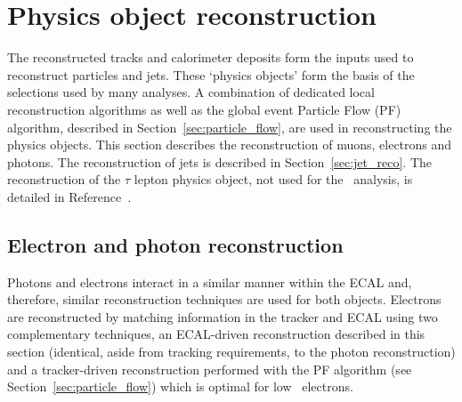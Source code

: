 \section{Physics object reconstruction}

The reconstructed tracks and calorimeter deposits form 
the inputs used to reconstruct particles and jets. These `physics objects'
form the basis of the selections used by many analyses. A combination 
of dedicated local reconstruction algorithms as well as the global event Particle
Flow (PF) algorithm, described in Section~\ref{sec:particle_flow}, are used in 
reconstructing the physics objects. This section describes the reconstruction
of muons, electrons and photons. The reconstruction of jets
is described in Section~\ref{sec:jet_reco}. The reconstruction of
the $\tau$ lepton physics object, not used for the \alphat~analysis, is 
detailed in Reference~\cite{Khachatryan:2062435}.


\subsection{Electron and photon reconstruction}
\label{sec:ele_pho_reco}

Photons and electrons interact in a similar manner within the ECAL and, therefore, similar reconstruction techniques
are used for both objects. Electrons are reconstructed by matching 
information in the tracker and ECAL using two complementary techniques, an ECAL-driven 
reconstruction described in this section (identical, aside from tracking
requirements, to the photon reconstruction) and a tracker-driven reconstruction performed with
the PF algorithm (see Section~\ref{sec:particle_flow}) which is optimal for low \pt~electrons. 

